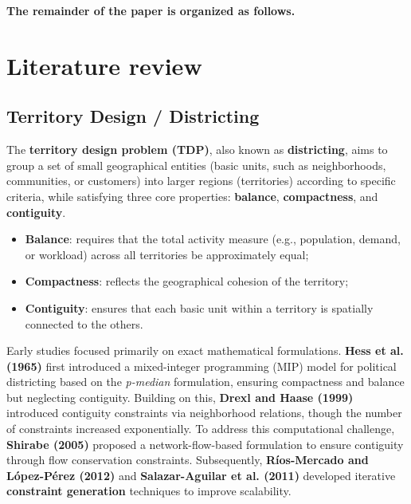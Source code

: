 \documentclass[preprint,12pt,authoryear]{elsarticle}
\begin{document}
\textbf{The remainder of the paper is organized as follows.}

\section{Literature review}

\subsection{Territory Design / Districting}

The \textbf{territory design problem (TDP)}, also known as \textbf{districting}, aims to group a set of small geographical entities (basic units, such as neighborhoods, communities, or customers) into larger regions (territories) according to specific criteria, while satisfying three core properties: \textbf{balance}, \textbf{compactness}, and \textbf{contiguity}.  

\begin{itemize}
    \item \textbf{Balance}: requires that the total activity measure (e.g., population, demand, or workload) across all territories be approximately equal;  
    \item \textbf{Compactness}: reflects the geographical cohesion of the territory;  
    \item \textbf{Contiguity}: ensures that each basic unit within a territory is spatially connected to the others.
\end{itemize}

Early studies focused primarily on exact mathematical formulations. \textbf{Hess et al. (1965)} first introduced a mixed-integer programming (MIP) model for political districting based on the \textit{p-median} formulation, ensuring compactness and balance but neglecting contiguity. Building on this, \textbf{Drexl and Haase (1999)} introduced contiguity constraints via neighborhood relations, though the number of constraints increased exponentially. To address this computational challenge, \textbf{Shirabe (2005)} proposed a network-flow-based formulation to ensure contiguity through flow conservation constraints. Subsequently, \textbf{Ríos-Mercado and López-Pérez (2012)} and \textbf{Salazar-Aguilar et al. (2011)} developed iterative \textbf{constraint generation} techniques to improve scalability.
\end{document}
